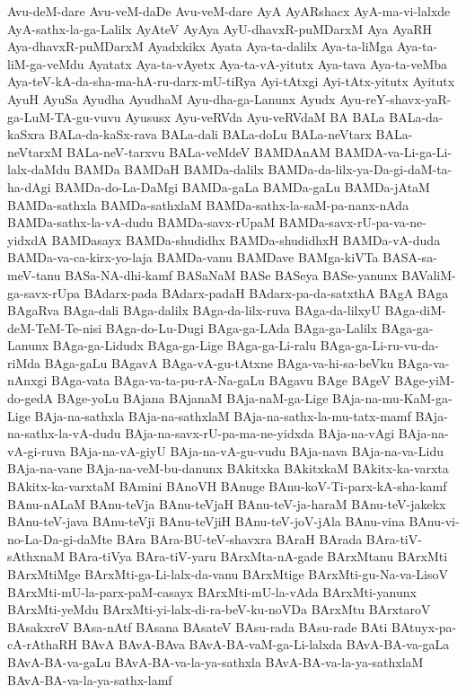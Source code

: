 {Avu-deM-dare
Avu-veM-daDe
Avu-veM-dare
AyA
AyARshacx
AyA-ma-vi-lalxde
AyA-sathx-la-ga-Lalilx
AyAteV
AyAya
AyU-dhavxR-puMDarxM
Aya
AyaRH
Aya-dhavxR-puMDarxM
Ayadxkikx
Ayata
Aya-ta-dalilx
Aya-ta-liMga
Aya-ta-liM-ga-veMdu
Ayatatx
Aya-ta-vAyetx
Aya-ta-vA-yitutx
Aya-tava
Aya-ta-veMba
Aya-teV-kA-da-sha-ma-hA-ru-darx-mU-tiRya
Ayi-tAtxgi
Ayi-tAtx-yitutx
Ayitutx
AyuH
AyuSa
Ayudha
AyudhaM
Ayu-dha-ga-Lanunx
Ayudx
Ayu-reY-shavx-yaR-ga-LuM-TA-gu-vuvu
Ayususx
Ayu-veRVda
Ayu-veRVdaM
BA
BALa
BALa-da-kaSxra
BALa-da-kaSx-rava
BALa-dali
BALa-doLu
BALa-neVtarx
BALa-neVtarxM
BALa-neV-tarxvu
BALa-veMdeV
BAMDAnAM
BAMDA-va-Li-ga-Li-lalx-daMdu
BAMDa
BAMDaH
BAMDa-dalilx
BAMDa-da-lilx-ya-Da-gi-daM-ta-ha-dAgi
BAMDa-do-La-DaMgi
BAMDa-gaLa
BAMDa-gaLu
BAMDa-jAtaM
BAMDa-sathxla
BAMDa-sathxlaM
BAMDa-sathx-la-saM-pa-nanx-nAda
BAMDa-sathx-la-vA-dudu
BAMDa-savx-rUpaM
BAMDa-savx-rU-pa-va-ne-yidxdA
BAMDasayx
BAMDa-shudidhx
BAMDa-shudidhxH
BAMDa-vA-duda
BAMDa-va-ca-kirx-yo-laja
BAMDa-vanu
BAMDave
BAMga-kiVTa
BASA-sa-meV-tanu
BASa-NA-dhi-kamf
BASaNaM
BASe
BASeya
BASe-yanunx
BAValiM-ga-savx-rUpa
BAdarx-pada
BAdarx-padaH
BAdarx-pa-da-satxthA
BAgA
BAga
BAgaRva
BAga-dali
BAga-dalilx
BAga-da-lilx-ruva
BAga-da-lilxyU
BAga-diM-deM-TeM-Te-nisi
BAga-do-Lu-Dugi
BAga-ga-LAda
BAga-ga-Lalilx
BAga-ga-Lanunx
BAga-ga-Lidudx
BAga-ga-Lige
BAga-ga-Li-ralu
BAga-ga-Li-ru-vu-da-riMda
BAga-gaLu
BAgavA
BAga-vA-gu-tAtxne
BAga-va-hi-sa-beVku
BAga-va-nAnxgi
BAga-vata
BAga-va-ta-pu-rA-Na-gaLu
BAgavu
BAge
BAgeV
BAge-yiM-do-gedA
BAge-yoLu
BAjana
BAjanaM
BAja-naM-ga-Lige
BAja-na-mu-KaM-ga-Lige
BAja-na-sathxla
BAja-na-sathxlaM
BAja-na-sathx-la-mu-tatx-mamf
BAja-na-sathx-la-vA-dudu
BAja-na-savx-rU-pa-ma-ne-yidxda
BAja-na-vAgi
BAja-na-vA-gi-ruva
BAja-na-vA-giyU
BAja-na-vA-gu-vudu
BAja-nava
BAja-na-va-Lidu
BAja-na-vane
BAja-na-veM-bu-danunx
BAkitxka
BAkitxkaM
BAkitx-ka-varxta
BAkitx-ka-varxtaM
BAmini
BAnoVH
BAnuge
BAnu-koV-Ti-parx-kA-sha-kamf
BAnu-nALaM
BAnu-teVja
BAnu-teVjaH
BAnu-teV-ja-haraM
BAnu-teV-jakekx
BAnu-teV-java
BAnu-teVji
BAnu-teVjiH
BAnu-teV-joV-jAla
BAnu-vina
BAnu-vi-no-La-Da-gi-daMte
BAra
BAra-BU-teV-shavxra
BAraH
BArada
BAra-tiV-sAthxnaM
BAra-tiVya
BAra-tiV-yaru
BArxMta-nA-gade
BArxMtanu
BArxMti
BArxMtiMge
BArxMti-ga-Li-lalx-da-vanu
BArxMtige
BArxMti-gu-Na-va-LisoV
BArxMti-mU-la-parx-paM-casayx
BArxMti-mU-la-vAda
BArxMti-yanunx
BArxMti-yeMdu
BArxMti-yi-lalx-di-ra-beV-ku-noVDa
BArxMtu
BArxtaroV
BAsakxreV
BAsa-nAtf
BAsana
BAsateV
BAsu-rada
BAsu-rade
BAti
BAtuyx-pa-cA-rAthaRH
BAvA
BAvA-BAva
BAvA-BA-vaM-ga-Li-lalxda
BAvA-BA-va-gaLa
BAvA-BA-va-gaLu
BAvA-BA-va-la-ya-sathxla
BAvA-BA-va-la-ya-sathxlaM
BAvA-BA-va-la-ya-sathx-lamf
}
